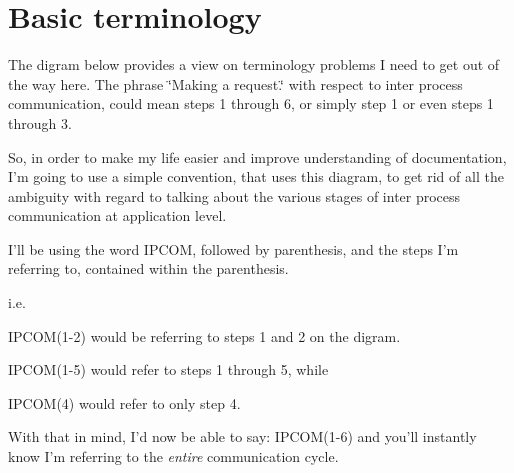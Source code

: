 \section*{Basic terminology}

The digram below provides a view on terminology problems I need to get out of the way here. The phrase \char`\"{}\-Making a request.\char`\"{} with respect to inter process communication, could mean steps 1 through 6, or simply step 1 or even steps 1 through 3.

So, in order to make my life easier and improve understanding of documentation, I'm going to use a simple convention, that uses this diagram, to get rid of all the ambiguity with regard to talking about the various stages of inter process communication at application level.

I'll be using the word I\-P\-C\-O\-M, followed by parenthesis, and the steps I'm referring to, contained within the parenthesis.

i.\-e.


\begin{DoxyItemize}
\item I\-P\-C\-O\-M(1-\/2) would be referring to steps 1 and 2 on the digram.
\item I\-P\-C\-O\-M(1-\/5) would refer to steps 1 through 5, while
\item I\-P\-C\-O\-M(4) would refer to only step 4.
\end{DoxyItemize}

With that in mind, I'd now be able to say\-: I\-P\-C\-O\-M(1-\/6) and you'll instantly know I'm referring to the {\itshape entire} communication cycle.

 